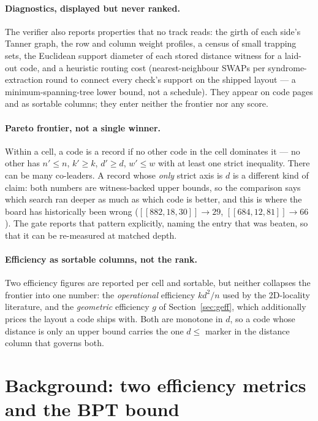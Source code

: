 \documentclass[11pt]{article}
\newcommand{\eff}{kd^2/n}
\begin{document}
	\paragraph{Diagnostics, displayed but never ranked.} The verifier also
	reports properties that no track reads: the girth of each side's Tanner
	graph, the row and column weight profiles, a census of small trapping
	sets, the Euclidean support diameter of each stored distance witness for
	a laid-out code, and a heuristic routing cost (nearest-neighbour SWAPs
	per syndrome-extraction round to connect every check's support on the
	shipped layout --- a minimum-spanning-tree lower bound, not a schedule).
	They appear on code pages and as sortable columns; they enter neither
	the frontier nor any score.

	\paragraph{Pareto frontier, not a single winner.} Within a cell, a code is
	a record if no other code in the cell dominates it --- no other has
	$n'\le n$, $k'\ge k$, $d'\ge d$, $w'\le w$ with at least one strict
	inequality. There can be many co-leaders. A record whose \emph{only}
	strict axis is $d$ is a different kind of claim: both numbers are
	witness-backed upper bounds, so the comparison says which search ran
	deeper as much as which code is better, and this is where the board has
	historically been wrong ($[[882,18,30]]\to 29$, $[[684,12,81]]\to 66$).
	The gate reports that pattern explicitly, naming the entry that was
	beaten, so that it can be re-measured at matched depth.

	\paragraph{Efficiency as sortable columns, not the rank.} Two efficiency
	figures are reported per cell and sortable, but neither collapses the
	frontier into one number: the \emph{operational} efficiency $\eff$ used
	by the 2D-locality literature, and the \emph{geometric} efficiency $g$
	of Section~\ref{sec:geff}, which additionally prices the layout a code
	ships with. Both are monotone in $d$, so a code whose distance is only
	an upper bound carries the one $d\le$ marker in the distance column
	that governs both.

	\section{Background: two efficiency metrics and the BPT bound}
\end{document}
